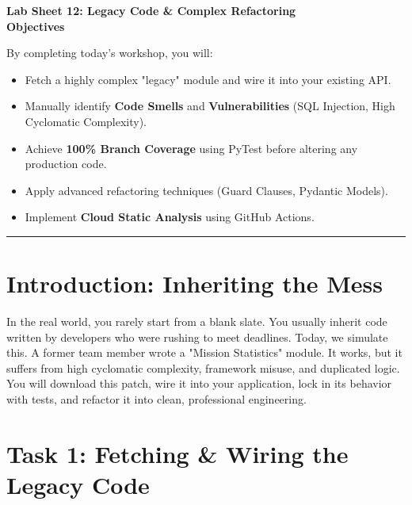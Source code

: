 \documentclass[a4paper,12pt]{article}
\begin{document}

\begin{center}
    \LARGE \textbf{Lab Sheet 12: Legacy Code \& Complex Refactoring} \\
    \vspace{0.5cm}
    \large \textbf{Objectives}
\end{center}

\noindent By completing today's workshop, you will:
\begin{itemize}
    \item Fetch a highly complex "legacy" module and wire it into your existing API.
    \item Manually identify \textbf{Code Smells} and \textbf{Vulnerabilities} (SQL Injection, High Cyclomatic Complexity).
    \item Achieve \textbf{100\% Branch Coverage} using PyTest before altering any production code.
    \item Apply advanced refactoring techniques (Guard Clauses, Pydantic Models).
    \item Implement \textbf{Cloud Static Analysis} using GitHub Actions.
\end{itemize}

\vspace{0.5cm}
\hrule
\vspace{0.5cm}

\section*{Introduction: Inheriting the Mess}
In the real world, you rarely start from a blank slate. You usually inherit code written by developers who were rushing to meet deadlines. Today, we simulate this. A former team member wrote a "Mission Statistics" module. It works, but it suffers from high cyclomatic complexity, framework misuse, and duplicated logic. You will download this patch, wire it into your application, lock in its behavior with tests, and refactor it into clean, professional engineering.


\section*{Task 1: Fetching \& Wiring the Legacy Code}
\end{document}
